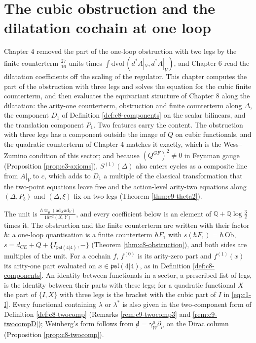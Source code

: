 \chapter{The cubic obstruction and the dilatation cochain at one loop}

Chapter 4 removed the part of the one-loop obstruction with two legs by the finite counterterm $\tfrac{27}{16}$ units times $\int\mathrm{dvol}\,(d^*A|_V,d^*A|_V)$, and Chapter 6 read the dilatation coefficients off the scaling of the regulator. This chapter computes the part of the obstruction with three legs and solves the equation for the cubic finite counterterm, and then evaluates the equivariant structure of Chapter 8 along the dilatation: the arity-one counterterm, obstruction and finite counterterm along $\Delta$, the component $D_1$ of Definition \ref{def:c8-components} on the scalar bilinears, and the translation component $P_1$. Two features carry the content. The obstruction with three legs has a component outside the image of $Q$ on cubic functionals, and the quadratic counterterm of Chapter 4 matches it exactly, which is the Wess--Zumino condition of this sector; and because $(Q^{GF})^2\neq0$ in Feynman gauge (Proposition \ref{prop:c3-axioms}), $S^{(1)}(\Delta)$ also enters cycles as a composite line from $A|_V$ to $c$, which adds to $D_1$ a multiple of the classical transformation that the two-point equations leave free and the action-level arity-two equations along $(\Delta,P_b)$ and $(\Delta,\xi)$ fix on two legs (Theorem \ref{thm:c9-theta2}).

The unit is $\frac{\hbar\operatorname{tr}_{\mathfrak g}(\mathrm{ad}_X\mathrm{ad}_Y)}{16\pi^2(X,Y)}$, and every coefficient below is an element of $\mathbb Q+\mathbb Q\log\tfrac32$ times it. The obstruction and the finite counterterm are written with their factor $\hbar$: a one-loop quantisation is a finite counterterm $\hbar F_1$ with $s(\hbar F_1)=\hbar\,\mathrm{Ob}$, $s=d_{CE}+Q+\{I_{\mathfrak{psl}(4|4)},-\}$ (Theorem \ref{thm:c8-obstruction}), and both sides are multiples of the unit. For a cochain $f$, $f^{(0)}$ is its arity-zero part and $f^{(1)}(x)$ its arity-one part evaluated on $x\in\mathfrak{psl}(4|4)$, as in Definition \ref{def:c8-components}. An identity between functionals in a sector, a prescribed list of legs, is the identity between their parts with these legs; for a quadratic functional $X$ the part of $\{I,X\}$ with three legs is the bracket with the cubic part of $I$ in \eqref{eq:c1-I}. Every functional containing $\lambda$ or $\lambda^*$ is also given in the two-component form of Definition \ref{def:c8-twocomp} (Remarks \ref{rem:c9-twocomp3} and \ref{rem:c9-twocompD}); Weinberg's form follows from ${\not d}=\gamma_W^\mu\partial_\mu$ on the Dirac column (Proposition \ref{prop:c8-twocomp}).

